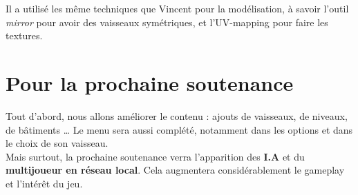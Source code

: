 \documentclass[10pt, titlepage]{report}
\begin{document}
Il a utilisé les même techniques que Vincent pour la modélisation, à savoir l'outil \textit{mirror} pour avoir des vaisseaux symétriques, et  l'UV-mapping pour faire les textures.


\chapter{Pour la prochaine soutenance}

Tout d'abord, nous allons améliorer le contenu : ajouts de vaisseaux, de niveaux, de bâtiments \dots
Le menu sera aussi complété, notamment dans les options et dans le choix de son vaisseau.\\

Mais surtout, la prochaine soutenance verra l'apparition des \textbf{I.A} et du \textbf{multijoueur en réseau local}. Cela augmentera considérablement le gameplay et l'intérêt du jeu.
\end{document}
